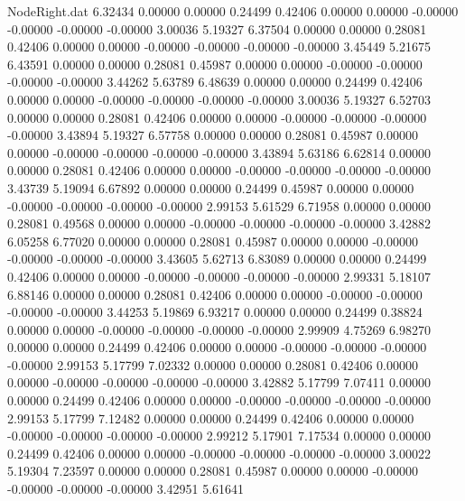 \begin{filecontents}{NodeRight.dat}
   6.32434    0.00000    0.00000     0.24499    0.42406    0.00000    0.00000   -0.00000   -0.00000   -0.00000   -0.00000    3.00036    5.19327
   6.37504    0.00000    0.00000     0.28081    0.42406    0.00000    0.00000   -0.00000   -0.00000   -0.00000   -0.00000    3.45449    5.21675
   6.43591    0.00000    0.00000     0.28081    0.45987    0.00000    0.00000   -0.00000   -0.00000   -0.00000   -0.00000    3.44262    5.63789
   6.48639    0.00000    0.00000     0.24499    0.42406    0.00000    0.00000   -0.00000   -0.00000   -0.00000   -0.00000    3.00036    5.19327
   6.52703    0.00000    0.00000     0.28081    0.42406    0.00000    0.00000   -0.00000   -0.00000   -0.00000   -0.00000    3.43894    5.19327
   6.57758    0.00000    0.00000     0.28081    0.45987    0.00000    0.00000   -0.00000   -0.00000   -0.00000   -0.00000    3.43894    5.63186
   6.62814    0.00000    0.00000     0.28081    0.42406    0.00000    0.00000   -0.00000   -0.00000   -0.00000   -0.00000    3.43739    5.19094
   6.67892    0.00000    0.00000     0.24499    0.45987    0.00000    0.00000   -0.00000   -0.00000   -0.00000   -0.00000    2.99153    5.61529
   6.71958    0.00000    0.00000     0.28081    0.49568    0.00000    0.00000   -0.00000   -0.00000   -0.00000   -0.00000    3.42882    6.05258
   6.77020    0.00000    0.00000     0.28081    0.45987    0.00000    0.00000   -0.00000   -0.00000   -0.00000   -0.00000    3.43605    5.62713
   6.83089    0.00000    0.00000     0.24499    0.42406    0.00000    0.00000   -0.00000   -0.00000   -0.00000   -0.00000    2.99331    5.18107
   6.88146    0.00000    0.00000     0.28081    0.42406    0.00000    0.00000   -0.00000   -0.00000   -0.00000   -0.00000    3.44253    5.19869
   6.93217    0.00000    0.00000     0.24499    0.38824    0.00000    0.00000   -0.00000   -0.00000   -0.00000   -0.00000    2.99909    4.75269
   6.98270    0.00000    0.00000     0.24499    0.42406    0.00000    0.00000   -0.00000   -0.00000   -0.00000   -0.00000    2.99153    5.17799
   7.02332    0.00000    0.00000     0.28081    0.42406    0.00000    0.00000   -0.00000   -0.00000   -0.00000   -0.00000    3.42882    5.17799
   7.07411    0.00000    0.00000     0.24499    0.42406    0.00000    0.00000   -0.00000   -0.00000   -0.00000   -0.00000    2.99153    5.17799
   7.12482    0.00000    0.00000     0.24499    0.42406    0.00000    0.00000   -0.00000   -0.00000   -0.00000   -0.00000    2.99212    5.17901
   7.17534    0.00000    0.00000     0.24499    0.42406    0.00000    0.00000   -0.00000   -0.00000   -0.00000   -0.00000    3.00022    5.19304
   7.23597    0.00000    0.00000     0.28081    0.45987    0.00000    0.00000   -0.00000   -0.00000   -0.00000   -0.00000    3.42951    5.61641

\end{filecontents}
